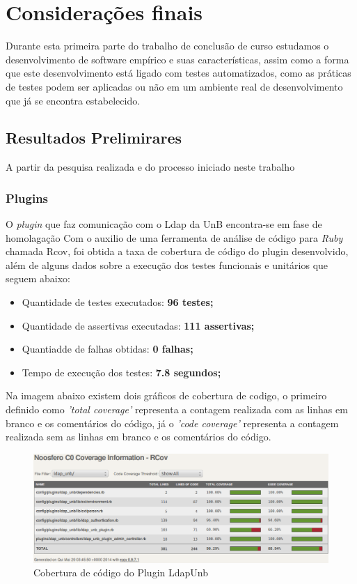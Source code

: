 \chapter{Considerações finais}
\label{consideracoes-finais}

Durante esta primeira parte do trabalho de conclusão de curso estudamos o desenvolvimento de software empírico e suas características, assim como a forma que este desenvolvimento está ligado com testes automatizados, como as práticas de testes podem ser aplicadas ou não em um ambiente real de desenvolvimento
que já se encontra estabelecido.

\section{Resultados Prelimirares}
\label{results}

A partir da pesquisa realizada e do processo iniciado neste trabalho
\subsection{Plugins}

O \textit{plugin} que faz comunicação com o Ldap da UnB encontra-se em fase de homolagação
Com o auxilio de uma ferramenta de análise de código para \textit{Ruby} chamada Rcov, foi obtida a taxa de cobertura de código do plugin desenvolvido, além de alguns dados sobre a execução dos testes funcionais e unitários que seguem abaixo:

\begin{itemize}
\item Quantidade de testes executados: \textbf{96 testes;}
\item Quantidade de assertivas executadas: \textbf{111 assertivas;}
\item Quantiadde de falhas obtidas: \textbf{0 falhas;}
\item Tempo de execução dos testes: \textbf{7.8 segundos;}
\end{itemize}

Na imagem abaixo existem dois gráficos de cobertura de codigo, o primeiro definido como \textit{'total coverage'} representa a contagem realizada com as linhas em branco e os comentários do código, já o \textit{'code coverage'} representa a contagem realizada sem as linhas em branco e os comentários do código.

%
\begin{figure}[!h]
    \centering
    \includegraphics[keepaspectratio=false,scale=0.45]
      {figuras/cobertura_teste.eps}
    \caption{Cobertura de código do Plugin LdapUnb}
    \label{consideracoes_cobertura1}
\end{figure}
%


